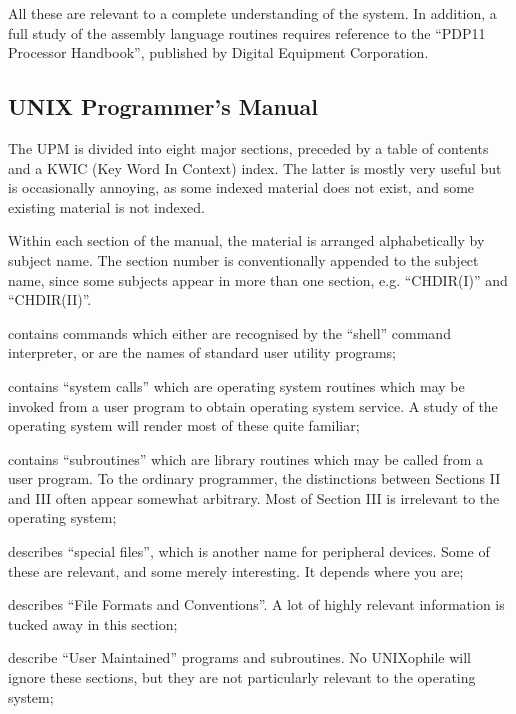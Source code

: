 All these are relevant to a complete
understanding of the system. In addition,
a full study of the assembly
language routines requires reference to
the ``PDP11 Processor Handbook'', published
by Digital Equipment Corporation.


\subsection{UNIX Programmer's Manual}

The UPM is divided into eight major
sections, preceded by a table of contents
and a KWIC (Key Word In Context)
index. The latter is mostly very useful but
is occasionally annoying, as
some indexed material does not exist,
and some existing material is not
indexed.

Within each section of the manual, the
material is arranged alphabetically by
subject name. The section number is
conventionally appended to the subject
name, since some subjects appear in
more than one section, e.g. ``CHDIR(I)''
and ``CHDIR(II)''.

\bd
\item[Section I] contains commands which
either are recognised by the
``shell'' command interpreter, or
are the names of standard user
utility programs;

\item[Section II] contains ``system calls''
which are operating system routines which
may be invoked from a
user program to obtain operating
system service. A study of the
operating system will render most
of these quite familiar;

\item[Section III] contains ``subroutines''
which are library routines which
may be called from a user program.
To the ordinary programmer, the
distinctions between Sections II
and III often appear somewhat
arbitrary. Most of Section III is
irrelevant to the operating system;

\item[Section IV] describes ``special
files'', which is another name for
peripheral devices. Some of these
are relevant, and some merely
interesting. It depends where you
are;

\item[Section V] describes ``File Formats
and Conventions''. A lot of highly
relevant information is tucked
away in this section;

\item[Sections VI and VII] describe ``User
Maintained'' programs and subroutines.
No UNIXophile will ignore
these sections, but they are not
particularly relevant to the
operating system;

